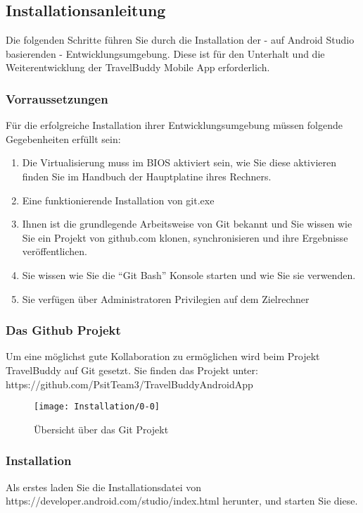 \subsection{Installationsanleitung}
Die folgenden Schritte führen Sie durch die Installation der - auf Android Studio basierenden - Entwicklungsumgebung. Diese ist für den Unterhalt und die Weiterentwicklung der TravelBuddy Mobile App erforderlich.

\subsubsection{Vorraussetzungen}
Für die erfolgreiche Installation ihrer Entwicklungsumgebung müssen folgende Gegebenheiten erfüllt sein:
\begin{enumerate}
  \item Die Virtualisierung muss im BIOS aktiviert sein, wie Sie diese aktivieren finden Sie im Handbuch der Hauptplatine ihres Rechners.
  \item Eine funktionierende Installation von git.exe
  \item Ihnen ist die grundlegende Arbeitsweise von Git bekannt und Sie wissen wie Sie ein Projekt von github.com klonen, synchronisieren und ihre Ergebnisse veröffentlichen.
  \item Sie wissen wie Sie die ``Git Bash'' Konsole starten und wie Sie sie verwenden.
  \item Sie verfügen über Administratoren Privilegien auf dem Zielrechner
\end{enumerate}

\subsubsection{Das Github Projekt}
Um eine möglichst gute Kollaboration zu ermöglichen wird beim Projekt TravelBuddy auf Git gesetzt.
Sie finden das Projekt unter: https://github.com/PsitTeam3/TravelBuddyAndroidApp
\begin{figure}
  \centering
  \texttt{[image: Installation/0-0]}
  \caption{Übersicht über das Git Projekt}
\end{figure}

\subsubsection{Installation}


Als erstes laden Sie die Installationsdatei von https://developer.android.com/studio/index.html herunter, und starten Sie diese.

